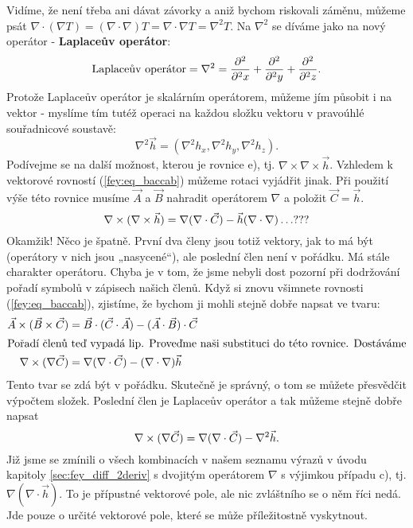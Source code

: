     Vidíme, že není třeba ani dávat závorky a aniž bychom riskovali záměnu, můžeme psát \(\nabla 
    \cdot(\nabla T) = (\nabla\cdot\nabla)T = \nabla\cdot\nabla T = \nabla^2T\). Na \(\nabla^2\) se díváme 
    jako na nový operátor - \textbf{Laplaceův operátor}:
    \begin{equation}\label{FYZ:eq_lapl_op}
      \text{Laplaceův operátor} = \nabla^2 = \frac{\partial^2 }{\partial^2 x} + \frac{\partial^2 }{\partial^2 y} + \frac{\partial^2 }{\partial^2 z}.
    \end{equation}
    Protože Laplaceův operátor je skalárním operátorem, můžeme jím působit i na vektor - myslíme tím tutéž 
    operaci na každou složku vektoru v pravoúhlé souřadnicové soustavě:
    \begin{equation*}
      \nabla^2\vec{h} = (\nabla^2h_x, \nabla^2h_y, \nabla^2h_z).
    \end{equation*}
    Podívejme se na další možnost, kterou je rovnice e), tj. \(\nabla\times\nabla\times\vec{h}\). Vzhledem  
    k vektorové rovností (\ref{fey:eq_baccab}) můžeme rotaci vyjádřit jinak. Při použití výše této rovnice 
    musíme \(\vec{A}\) a \(\vec{B}\) nahradit operátorem \(\nabla\) a položit \(\vec{C} = \vec{h}\).
    \begin{equation*}
      \nabla\times(\nabla\times\vec{h}) = \nabla(\nabla\cdot\vec{C}) - \vec{h}(\nabla\cdot\nabla) \ldots ???
    \end{equation*}
    Okamžik! Něco je špatně. První dva členy jsou totiž vektory, jak to má být (operátory v nich jsou 
    „nasycené“), ale poslední člen není v pořádku. Má stále charakter operátoru. Chyba je v tom, že jsme 
    nebyli dost pozorní při dodržování pořadí symbolů v zápisech našich členů. Když si znovu všimnete 
    rovnosti (\ref{fey:eq_baccab}), zjistíme, že bychom ji mohli stejně dobře napsat ve tvaru:
    \begin{align*}
      \vec{A}\times(\vec{B}\times\vec{C}) 
        &= \vec{B}\cdot(\vec{C}\cdot\vec{A}) - (\vec{A}\cdot\vec{B})\cdot\vec{C}  \\
      \shortintertext{Pořadí členů teď vypadá lip. Proveďme naši substituci do této rovnice. Dostáváme} 
      \nabla\times(\nabla\vec{C})
        &= \nabla(\nabla\cdot\vec{C}) - (\nabla\cdot\nabla)\vec{h} 
    \end{align*}
    Tento tvar se zdá být v pořádku. Skutečně je správný, o tom se můžete přesvědčit výpočtem složek.
    Poslední člen je Laplaceův operátor a tak můžeme stejně dobře napsat
    \begin{equation*}
      \nabla\times(\nabla\vec{C}) = \nabla(\nabla\cdot\vec{C}) - \nabla^2\vec{h}.
    \end{equation*}         
    Již jsme se zmínili o všech kombinacích v našem seznamu výrazů v úvodu kapitoly  
    \ref{sec:fey_diff_2deriv} s dvojitým operátorem \(\nabla\) s výjimkou případu c), 
    tj.\(\nabla(\nabla\cdot\vec{h})\). To je přípustné vektorové pole, ale nic zvláštního se o něm říci 
    nedá. Jde pouze o určité vektorové pole, které se může příležitostně vyskytnout.

